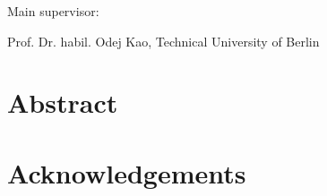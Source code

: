 \rule{0cm}{20cm}

\noindent Main supervisor: 

\noindent Prof. Dr. habil. Odej Kao, Technical University of Berlin

\thispagestyle{empty}


\chapter*{Abstract}

\abstracttext

\thispagestyle{empty}
\newpage
\vspace*{3cm}
\thispagestyle{empty}

\chapter*{Acknowledgements}

\acktext


\thispagestyle{empty}
\newpage
\vspace*{3cm}
\thispagestyle{empty}



\setcounter{page}{8}
\tableofcontents

\newpage


\listoffigures
\listoftables
\Listofabbrev
\newpage
\thispagestyle{empty}
\newpage
\vspace*{3cm}
\thispagestyle{empty} \newpage
{}\setcounter{page}{1}